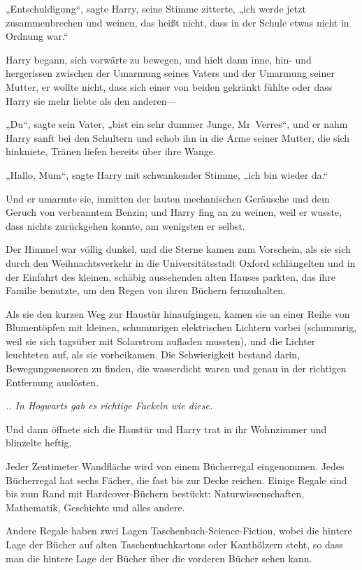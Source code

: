 {„Entschuldigung“, sagte Harry, seine Stimme zitterte, „ich werde jetzt zusammenbrechen und weinen, das heißt nicht, dass in der Schule etwas nicht in Ordnung war.“

Harry begann, sich vorwärts zu bewegen, und hielt dann inne, hin- und hergerissen zwischen der Umarmung seines Vaters und der Umarmung seiner Mutter, er wollte nicht, dass sich einer von beiden gekränkt fühlte oder dass Harry sie mehr liebte als den anderen—

„Du“, sagte sein Vater, „bist ein sehr dummer Junge, Mr~Verres“, und er nahm Harry sanft bei den Schultern und schob ihn in die Arme seiner Mutter, die sich hinkniete, Tränen liefen bereits über ihre Wange.

„Hallo, Mum“, sagte Harry mit schwankender Stimme, „ich bin wieder da.“

Und er umarmte sie, inmitten der lauten mechanischen Geräusche und dem Geruch von verbranntem Benzin; und Harry fing an zu weinen, weil er wusste, dass nichts zurückgehen konnte, am wenigsten er selbst.

Der Himmel war völlig dunkel, und die Sterne kamen zum Vorschein, als sie sich durch den Weihnachtsverkehr in die Universitätsstadt Oxford schlängelten und in der Einfahrt des kleinen, schäbig aussehenden alten Hauses parkten, das ihre Familie benutzte, um den Regen von ihren Büchern fernzuhalten.

Als sie den kurzen Weg zur Haustür hinaufgingen, kamen sie an einer Reihe von Blumentöpfen mit kleinen, schummrigen elektrischen Lichtern vorbei (schummrig, weil sie sich tagsüber mit Solarstrom aufladen mussten), und die Lichter leuchteten auf, als sie vorbeikamen. Die Schwierigkeit bestand darin, Bewegungssensoren zu finden, die wasserdicht waren und genau in der richtigen Entfernung auslösten.

\emph{.. In Hogwarts gab es richtige Fackeln wie diese.}

Und dann öffnete sich die Haustür und Harry trat in ihr Wohnzimmer und blinzelte heftig.

Jeder Zentimeter Wandfläche wird von einem Bücherregal eingenommen. Jedes Bücherregal hat sechs Fächer, die fast bis zur Decke reichen. Einige Regale sind bis zum Rand mit Hardcover-Büchern bestückt: Naturwissenschaften, Mathematik, Geschichte und alles andere.

Andere Regale haben zwei Lagen Taschenbuch-Science-Fiction, wobei die hintere Lage der Bücher auf alten Taschentuchkartons oder Kanthölzern steht, so dass man die hintere Lage der Bücher über die vorderen Bücher sehen kann.

}
